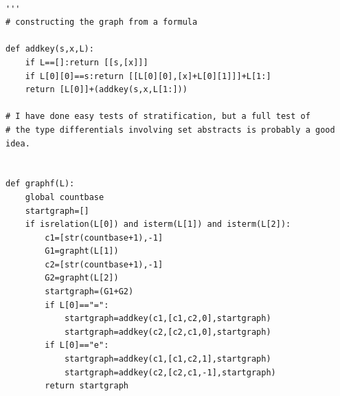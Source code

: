 \documentclass{article}
\begin{document}
\begin{verbatim}

'''
# constructing the graph from a formula

def addkey(s,x,L):
    if L==[]:return [[s,[x]]]
    if L[0][0]==s:return [[L[0][0],[x]+L[0][1]]]+L[1:]
    return [L[0]]+(addkey(s,x,L[1:]))

# I have done easy tests of stratification, but a full test of
# the type differentials involving set abstracts is probably a good idea.


def graphf(L):
    global countbase
    startgraph=[]
    if isrelation(L[0]) and isterm(L[1]) and isterm(L[2]):
        c1=[str(countbase+1),-1]
        G1=grapht(L[1])
        c2=[str(countbase+1),-1]        
        G2=grapht(L[2])
        startgraph=(G1+G2)
        if L[0]=="=":
            startgraph=addkey(c1,[c1,c2,0],startgraph)
            startgraph=addkey(c2,[c2,c1,0],startgraph)
        if L[0]=="e":
            startgraph=addkey(c1,[c1,c2,1],startgraph)
            startgraph=addkey(c2,[c2,c1,-1],startgraph)
        return startgraph
 


\end{verbatim}
\end{document}
